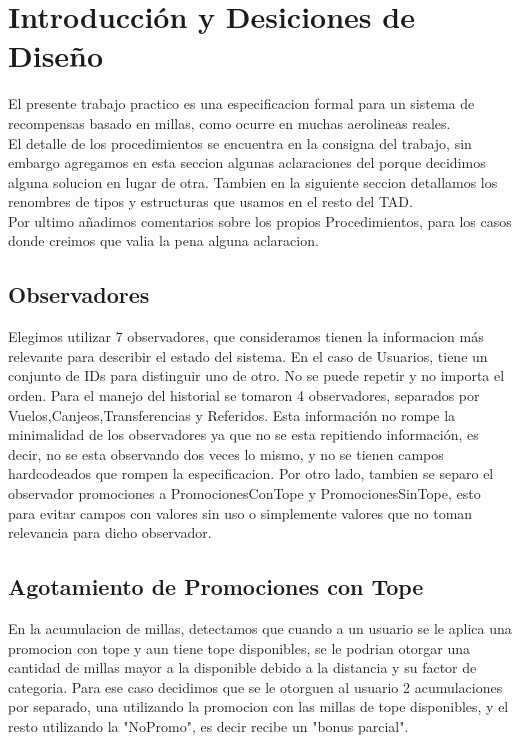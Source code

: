 \documentclass[11pt,a4paper]{article}
\begin{document}
\maketitle
\section{Introducción y Desiciones de Diseño}
El presente trabajo practico es una especificacion formal para un sistema de recompensas basado en millas, como ocurre en muchas aerolineas reales.\\
El detalle de los procedimientos se encuentra en la consigna del trabajo, sin embargo agregamos en esta seccion algunas aclaraciones del porque decidimos alguna solucion en lugar de otra. Tambien en la siguiente seccion detallamos los renombres de tipos y estructuras que usamos en el resto del TAD.\\
Por ultimo añadimos comentarios sobre los propios Procedimientos, para los casos donde creimos que valia la pena alguna aclaracion.\\

\subsection{Observadores}
Elegimos utilizar 7 observadores, que consideramos tienen la informacion más relevante para describir el estado del sistema. 
En el caso de Usuarios, tiene un conjunto de IDs para distinguir uno de otro. No se puede repetir y no importa el orden.
Para el manejo del historial se tomaron 4 observadores, separados por Vuelos,Canjeos,Transferencias y Referidos. Esta información no rompe la minimalidad de los observadores ya que no se esta repitiendo información, es decir, no se esta observando dos veces lo mismo, y no se tienen campos hardcodeados que rompen la especificacion.
Por otro lado, tambien se separo el observador promociones a PromocionesConTope y PromocionesSinTope, esto para evitar campos con valores sin uso o simplemente valores que no toman relevancia para dicho observador.

\subsection{Agotamiento de Promociones con Tope}
En la acumulacion de millas, detectamos que cuando a un usuario se le aplica una promocion con tope y aun tiene tope disponibles, se le podrian otorgar una cantidad de millas mayor a la disponible debido a la distancia y su factor de categoria. Para ese caso decidimos que se le otorguen al usuario 2 acumulaciones por separado, una utilizando la promocion con las millas de tope disponibles, y el resto utilizando la "NoPromo", es decir recibe un "bonus parcial".
\end{document}
